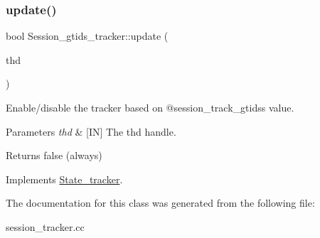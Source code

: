 \mbox{\label{classSession__gtids__tracker_a02f3fb9545c5dfbedb9022f55ce03e6c}} 
\subsubsection{\texorpdfstring{update()}{update()}}
{\footnotesize\ttfamily bool Session\+\_\+gtids\+\_\+tracker\+::update (\begin{DoxyParamCaption}\item[{T\+HD $\ast$}]{thd }\end{DoxyParamCaption})\hspace{0.3cm}{\ttfamily [virtual]}}



Enable/disable the tracker based on @session\+\_\+track\+\_\+gtids\textquotesingle{}s value. 


\begin{DoxyParams}{Parameters}
{\em thd} & \mbox{[}IN\mbox{]} The thd handle.\\
\hline
\end{DoxyParams}
\begin{DoxyReturn}{Returns}
false (always) 
\end{DoxyReturn}


Implements \mbox{\hyperlink{classState__tracker_a74ffdcb79733e8d31e9fe2dcae346022}{State\+\_\+tracker}}.



The documentation for this class was generated from the following file\+:\begin{DoxyCompactItemize}
\item 
session\+\_\+tracker.\+cc\end{DoxyCompactItemize}
